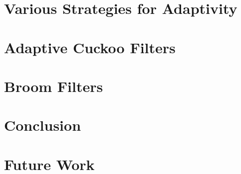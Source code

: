 \documentclass[11pt]{article}
\begin{document}


\section{Various Strategies for Adaptivity}



\section{Adaptive Cuckoo Filters}



\section{Broom Filters}



\section{Conclusion}



\section{Future Work}






\end{document}
